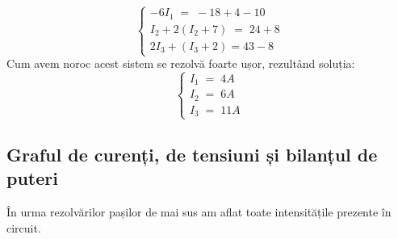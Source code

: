 \documentclass[12pt, a4paper]{article}
\begin{document}
\begin{equation}\nonumber
        \left\{
        \begin{array}{lr}
            -6I_1\;=\;-18 + 4 - 10\\[10pt]
            I_2 + 2(I_2 + 7)\;=\;24 + 8\\[10pt]
            2I_3 + (I_3 + 2) = 43 - 8
        \end{array}
        \right.
\end{equation}
Cum avem noroc acest sistem se rezolvă foarte ușor, rezultând soluția:
\begin{equation}\nonumber
        \left\{
        \begin{array}{lr}
            I_1\;=\;4A\\[10pt]
            I_2\;=\;6A\\[10pt]
            I_3\;=\;11A
        \end{array}
        \right.
\end{equation}
\newpage
\subsection{Graful de curenți, de tensiuni și bilanțul de puteri}
În urma rezolvărilor pașilor de mai sus am aflat toate intensitățile prezente în circuit.
\end{document}
